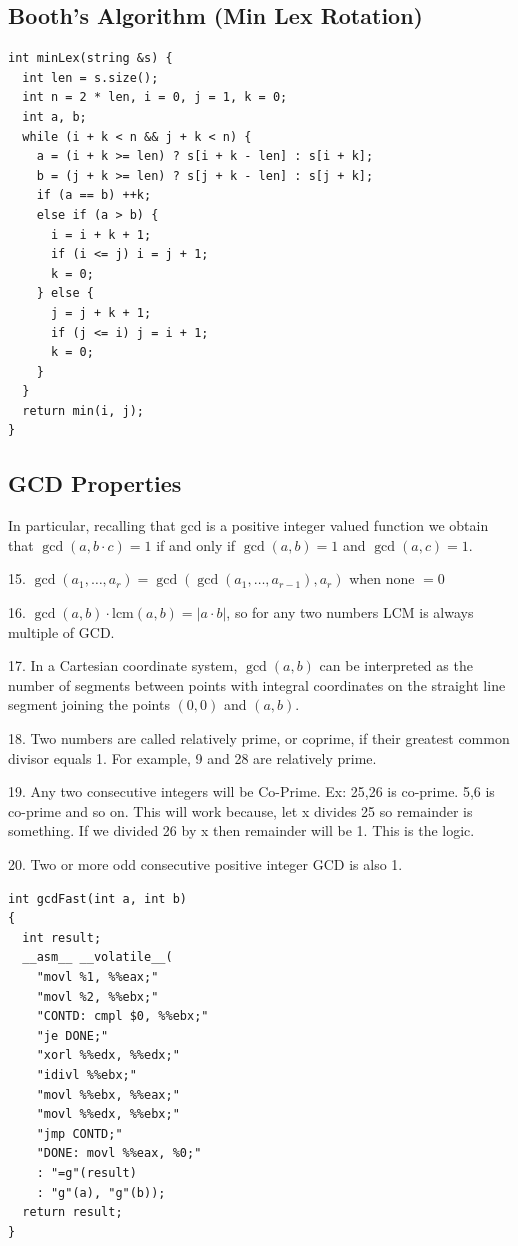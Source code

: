\subsection{Booth's Algorithm (Min Lex Rotation)}
\begin{verbatim}
int minLex(string &s) {
  int len = s.size();
  int n = 2 * len, i = 0, j = 1, k = 0;
  int a, b;
  while (i + k < n && j + k < n) {
    a = (i + k >= len) ? s[i + k - len] : s[i + k];
    b = (j + k >= len) ? s[j + k - len] : s[j + k];
    if (a == b) ++k;
    else if (a > b) {
      i = i + k + 1;
      if (i <= j) i = j + 1;
      k = 0;
    } else {
      j = j + k + 1;
      if (j <= i) j = i + 1;
      k = 0;
    }
  }
  return min(i, j);
}
\end{verbatim}
\subsection{GCD Properties}
In particular, recalling that gcd is a positive integer valued function we obtain that $\gcd(a, b \cdot c) = 1$ if and only if $\gcd(a, b) = 1$ and $\gcd(a, c) = 1$.

15. $\gcd(a_1, \ldots, a_r) = \gcd(\gcd(a_1, \ldots, a_{r-1}), a_r)$ when none $=0$

16. $\gcd(a,b) \cdot \text{lcm}(a,b) = |a \cdot b|$, so for any two numbers LCM is always multiple of GCD.

17. In a Cartesian coordinate system, $\gcd(a, b)$ can be interpreted as the number of segments between points with integral coordinates on the straight line segment joining the points $(0, 0)$ and $(a, b)$.

18. Two numbers are called relatively prime, or coprime, if their greatest common divisor equals 1. For example, 9 and 28 are relatively prime.

19. Any two consecutive integers will be Co-Prime. Ex: 25,26 is co-prime. 5,6 is co-prime and so on. This will work because, let x divides 25 so remainder is something. If we divided 26 by x then remainder will be 1. This is the logic.

20. Two or more odd consecutive positive integer GCD is also 1.
\begin{verbatim}
int gcdFast(int a, int b)
{
  int result;
  __asm__ __volatile__(
    "movl %1, %%eax;"
    "movl %2, %%ebx;"
    "CONTD: cmpl $0, %%ebx;"
    "je DONE;"
    "xorl %%edx, %%edx;"
    "idivl %%ebx;"
    "movl %%ebx, %%eax;"
    "movl %%edx, %%ebx;"
    "jmp CONTD;"
    "DONE: movl %%eax, %0;"
    : "=g"(result)
    : "g"(a), "g"(b));
  return result;
}
\end{verbatim}
